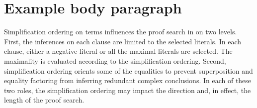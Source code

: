 \documentclass{article}
\begin{document}
\maketitle

\section{Example body paragraph}

Simplification ordering on terms
influences the proof search in \vampire{} on two levels.
First, the inferences on each clause are limited
to the selected literals.
In each clause,
either a negative literal or all the maximal literals are selected.
The maximality is evaluated
according to the simplification ordering.
Second, simplification ordering orients some of the equalities
to prevent superposition and equality factoring
from inferring redundant complex conclusions.
In each of these two roles,
the simplification ordering may impact the direction and,
in effect, the length of the proof search.
\end{document}
